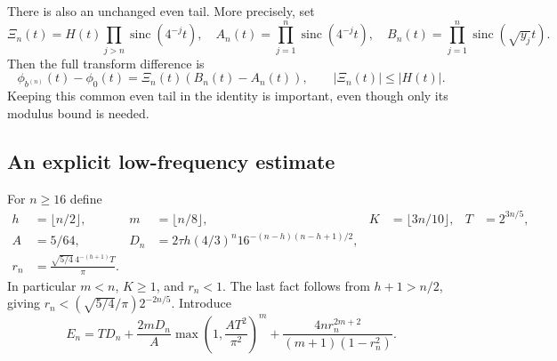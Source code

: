 \documentclass[11pt,a4paper]{article}
\numberwithin{equation}{section}
\theoremstyle{definition}
\theoremstyle{remark}
\DeclareMathOperator{\sinc}{sinc}
\begin{document}
There is also an unchanged even tail. More precisely, set
\[
 \Xi_n(t)=H(t)\prod_{j>n}\sinc(4^{-j}t),\quad
 A_n(t)=\prod_{j=1}^n\sinc(4^{-j}t),\quad
 B_n(t)=\prod_{j=1}^n\sinc(\sqrt{y_j}t).
\]
Then the full transform difference is
\begin{equation}
 \phi_{b^{(n)}}(t)-\phi_0(t)=\Xi_n(t)(B_n(t)-A_n(t)),
 \qquad |\Xi_n(t)|\le|H(t)|.
 \label{eq:full-difference}
\end{equation}
Keeping this common even tail in the identity is important, even though only
its modulus bound is needed.

\subsection{An explicit low-frequency estimate}

For $n\ge16$ define
\begin{align}
 h&=\lfloor n/2\rfloor,&m&=\lfloor n/8\rfloor,
 &K&=\lfloor3n/10\rfloor,&T&=2^{3n/5},                 \label{eq:cutoffs}\\
 A&=5/64,&
 D_n&=2\tau h(4/3)^n16^{-(n-h)(n-h+1)/2},              \label{eq:Dn}\\
 r_n&=\frac{\sqrt{5/4}\,4^{-(h+1)}T}{\pi}.            \label{eq:rn}
\end{align}
In particular $m<n$, $K\ge1$, and $r_n<1$. The last fact follows from
$h+1>n/2$, giving $r_n<(\sqrt{5/4}/\pi)2^{-2n/5}$.
Introduce
\begin{equation}
 E_n=TD_n+\frac{2mD_n}{A}
       \max\left(1,\frac{AT^2}{\pi^2}\right)^m
       +\frac{4n r_n^{2m+2}}{(m+1)(1-r_n^2)}.
 \label{eq:En}
\end{equation}
\end{document}
